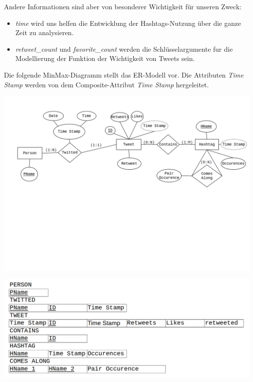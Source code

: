 \documentclass[paper=a4, english, ngerman, romanian]{scrartcl}
\begin{document}
		Andere Informationen sind aber von besonderer Wichtigkeit für unseren Zweck:
		
		\begin{itemize}
		\item \textit{time} wird uns helfen die Entwicklung der Hashtags-Nutzung über die ganze Zeit zu analysieren. 
		\item \textit{retweet\_count} und \textit{favorite\_count} werden die Schlüsselargumente fur die Modellierung der Funktion der Wichtigkeit von Tweets sein.
		\end{itemize}
	
	Die folgende MinMax-Diagramm stellt das ER-Modell vor. Die Attributen \textit{Time Stamp} werden von dem Composite-Attribut \textit{Time Stamp} hergeleitet.
	
	\includegraphics[scale=0.8]{MinMax_Diagram.png}

\begin{center}
\includegraphics[scale=0.25]{Screenshot_2017-05-08_21-17-03}
\end{center}
	
\end{document}
